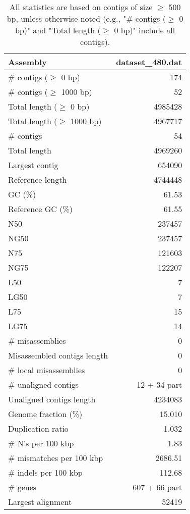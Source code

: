 \documentclass[12pt,a4paper]{article}
\begin{document}
\begin{table}[ht]
\begin{center}
\caption{All statistics are based on contigs of size $\geq$ 500 bp, unless otherwise noted (e.g., "\# contigs ($\geq$ 0 bp)" and "Total length ($\geq$ 0 bp)" include all contigs).}
\begin{tabular}{|l*{1}{|r}|}
\hline
Assembly & dataset\_480.dat \\ \hline
\# contigs ($\geq$ 0 bp) & 174 \\ \hline
\# contigs ($\geq$ 1000 bp) & 52 \\ \hline
Total length ($\geq$ 0 bp) & 4985428 \\ \hline
Total length ($\geq$ 1000 bp) & 4967717 \\ \hline
\# contigs & 54 \\ \hline
Total length & 4969260 \\ \hline
Largest contig & 654090 \\ \hline
Reference length & 4744448 \\ \hline
GC (\%) & 61.53 \\ \hline
Reference GC (\%) & 61.55 \\ \hline
N50 & 237457 \\ \hline
NG50 & 237457 \\ \hline
N75 & 121603 \\ \hline
NG75 & 122207 \\ \hline
L50 & 7 \\ \hline
LG50 & 7 \\ \hline
L75 & 15 \\ \hline
LG75 & 14 \\ \hline
\# misassemblies & 0 \\ \hline
Misassembled contigs length & 0 \\ \hline
\# local misassemblies & 0 \\ \hline
\# unaligned contigs & 12 + 34 part \\ \hline
Unaligned contigs length & 4234083 \\ \hline
Genome fraction (\%) & 15.010 \\ \hline
Duplication ratio & 1.032 \\ \hline
\# N's per 100 kbp & 1.83 \\ \hline
\# mismatches per 100 kbp & 2686.51 \\ \hline
\# indels per 100 kbp & 112.68 \\ \hline
\# genes & 607 + 66 part \\ \hline
Largest alignment & 52419 \\ \hline
\end{tabular}
\end{center}
\end{table}
\end{document}
